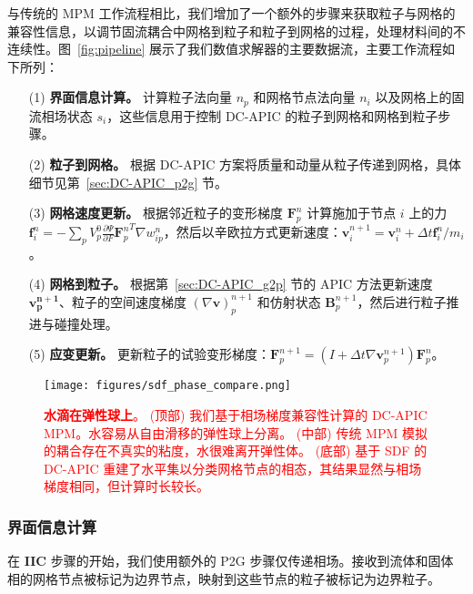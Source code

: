 与传统的 MPM 工作流程相比，我们增加了一个额外的步骤来获取粒子与网格的兼容性信息，以调节固流耦合中网格到粒子和粒子到网格的过程，处理材料间的不连续性。图~\ref{fig:pipeline} 展示了我们数值求解器的主要数据流，主要工作流程如下所列：

\begin{enumerate}
\item[(1)] \textbf{界面信息计算。} 计算粒子法向量 $n_p$ 和网格节点法向量 $n_i$ 以及网格上的固流相场状态 $s_i$，这些信息用于控制 DC-APIC 的粒子到网格和网格到粒子步骤。
\item[(2)] \textbf{粒子到网格。} 根据 DC-APIC 方案将质量和动量从粒子传递到网格，具体细节见第~\ref{sec:DC-APIC_p2g} 节。
\item[(3)] \textbf{网格速度更新。}
根据邻近粒子的变形梯度 $\mathbf{F}_p^n$ 计算施加于节点 $i$ 上的力 $\mathbf{f}_i^n=-\sum_p V_p^0 \frac{\partial \Psi}{\partial F} {\mathbf{F}_p^n}^T \nabla w_{ip}^n$，然后以辛欧拉方式更新速度：$\mathbf{v}_i^{n+1}=\mathbf{v}_i^n + \Delta t \mathbf{f}_i^n / m_i$。
\item[(4)] \textbf{网格到粒子。}
根据第~\ref{sec:DC-APIC_g2p} 节的 APIC 方法更新速度 $\mathbf{v_p^{n+1}}$、粒子的空间速度梯度 $(\nabla \mathbf{v})_p^{n+1}$ 和仿射状态 $\mathbf{B}_p^{n+1}$，然后进行粒子推进与碰撞处理。
\item[(5)] \textbf{应变更新。}
更新粒子的试验变形梯度：$\mathbf{F}_p^{n+1} = (I + \Delta t \nabla \mathbf{v}_p^{n+1}) \mathbf{F}_p^n$。

\end{enumerate}

\begin{figure}[htbp]
    \centering
    \texttt{[image: figures/sdf\_phase\_compare.png]}
    \caption{\textcolor{red}{\textbf{水滴在弹性球上}。 (顶部) 我们基于相场梯度兼容性计算的 DC-APIC MPM。水容易从自由滑移的弹性球上分离。 (中部) 传统 MPM 模拟的耦合存在不真实的粘度，水很难离开弹性体。 (底部) 基于 SDF 的 DC-APIC 重建了水平集以分类网格节点的相态，其结果显然与相场梯度相同，但计算时长较长。}}
    \label{fig:sdf_phase_compare}
\end{figure}

\subsubsection{界面信息计算}
\label{interface_information_calculation}
在 \textbf{IIC} 步骤的开始，我们使用额外的 P2G 步骤仅传递相场。接收到流体和固体相的网格节点被标记为边界节点，映射到这些节点的粒子被标记为边界粒子。

